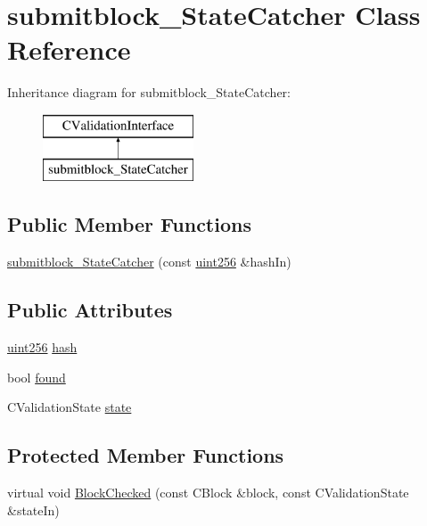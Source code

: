\hypertarget{classsubmitblock___state_catcher}{}\section{submitblock\+\_\+\+State\+Catcher Class Reference}
\label{classsubmitblock___state_catcher}
Inheritance diagram for submitblock\+\_\+\+State\+Catcher\+:\begin{figure}[H]
\begin{center}
\leavevmode
\includegraphics[height=2.000000cm]{classsubmitblock___state_catcher}
\end{center}
\end{figure}
\subsection*{Public Member Functions}
\begin{DoxyCompactItemize}
\item 
\mbox{\hyperlink{classsubmitblock___state_catcher_a4751e652aed4193935ed00e95cfca548}{submitblock\+\_\+\+State\+Catcher}} (const \mbox{\hyperlink{classuint256}{uint256}} \&hash\+In)
\end{DoxyCompactItemize}
\subsection*{Public Attributes}
\begin{DoxyCompactItemize}
\item 
\mbox{\hyperlink{classuint256}{uint256}} \mbox{\hyperlink{classsubmitblock___state_catcher_adcc822af0b1305bcda71f8e9656c4239}{hash}}
\item 
bool \mbox{\hyperlink{classsubmitblock___state_catcher_a61c0d03544cd4495534bdb0b52f36886}{found}}
\item 
C\+Validation\+State \mbox{\hyperlink{classsubmitblock___state_catcher_a78357802ab8d143f6f21929e0aa2d727}{state}}
\end{DoxyCompactItemize}
\subsection*{Protected Member Functions}
\begin{DoxyCompactItemize}
\item 
virtual void \mbox{\hyperlink{classsubmitblock___state_catcher_a7c7174ac1a54c80c572b115114aa2ee6}{Block\+Checked}} (const C\+Block \&block, const C\+Validation\+State \&state\+In)
\end{DoxyCompactItemize}


